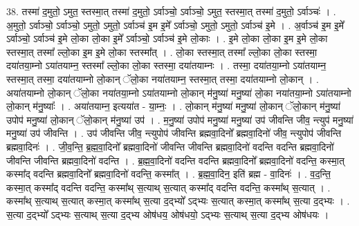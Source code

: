 \documentclass[17pt]{extarticle}
\begin{document}
38. तस्मा॑ द॒मुतो॒ ऽमुत॒ स्तस्मा॒त् तस्मा॑ द॒मुतो॒ ऽर्वाञ्चो॒ ऽर्वाञ्चो॒ ऽमुत॒ स्तस्मा॒त् तस्मा॑ द॒मुतो॒ ऽर्वाञ्चः॑ । . अ॒मुतो॒ ऽर्वाञ्चो॒ ऽर्वाञ्चो॒ ऽमुतो॒ ऽमुतो॒ ऽर्वाञ्च॑ इ॒म इ॒मे᳚ ऽर्वाञ्चो॒ ऽमुतो॒ ऽमुतो॒ ऽर्वाञ्च॑ इ॒मे । . अ॒र्वाञ्च॑ इ॒म इ॒मे᳚ ऽर्वाञ्चो॒ ऽर्वाञ्च॑ इ॒मे लो॒का लो॒का इ॒मे᳚ ऽर्वाञ्चो॒ ऽर्वाञ्च॑ इ॒मे लो॒काः । . इ॒मे लो॒का लो॒का इ॒म इ॒मे लो॒का स्तस्मा॒त् तस्मा᳚ ल्लो॒का इ॒म इ॒मे लो॒का स्तस्मा᳚त् । . लो॒का स्तस्मा॒त् तस्मा᳚ ल्लो॒का लो॒का स्तस्मा॒ दया॑तया॒म्नो ऽया॑तयाम्न॒ स्तस्मा᳚ ल्लो॒का लो॒का स्तस्मा॒ दया॑तयाम्नः । . तस्मा॒ दया॑तया॒म्नो ऽया॑तयाम्न॒ स्तस्मा॒त् तस्मा॒ दया॑तयाम्नो लो॒कान् ॅलो॒का नया॑तयाम्न॒ स्तस्मा॒त् तस्मा॒ दया॑तयाम्नो लो॒कान् । . अया॑तयाम्नो लो॒कान् ॅलो॒का नया॑तया॒म्नो ऽया॑तयाम्नो लो॒कान् म॑नु॒ष्या॑ मनु॒ष्या॑ लो॒का नया॑तया॒म्नो ऽया॑तयाम्नो लो॒कान् म॑नु॒ष्याः᳚ । . अया॑तयाम्न॒ इत्यया॑त - या॒म्नः॒ । . लो॒कान् म॑नु॒ष्या॑ मनु॒ष्या॑ लो॒कान् ॅलो॒कान् म॑नु॒ष्या॑ उपोप॑ मनु॒ष्या॑ लो॒कान् ॅलो॒कान् म॑नु॒ष्या॑ उप॑ । . म॒नु॒ष्या॑ उपोप॑ मनु॒ष्या॑ मनु॒ष्या॑ उप॑ जीवन्ति जीव॒ न्त्युप॑ मनु॒ष्या॑ मनु॒ष्या॑ उप॑ जीवन्ति । . उप॑ जीवन्ति जीव॒ न्त्युपोप॑ जीवन्ति ब्रह्मवा॒दिनो᳚ ब्रह्मवा॒दिनो॑ जीव॒ न्त्युपोप॑ जीवन्ति ब्रह्मवा॒दिनः॑ । . जी॒व॒न्ति॒ ब्र॒ह्म॒वा॒दिनो᳚ ब्रह्मवा॒दिनो॑ जीवन्ति जीवन्ति ब्रह्मवा॒दिनो॑ वदन्ति वदन्ति ब्रह्मवा॒दिनो॑ जीवन्ति जीवन्ति ब्रह्मवा॒दिनो॑ वदन्ति । . ब्र॒ह्म॒वा॒दिनो॑ वदन्ति वदन्ति ब्रह्मवा॒दिनो᳚ ब्रह्मवा॒दिनो॑ वदन्ति॒ कस्मा॒त् कस्मा᳚द् वदन्ति ब्रह्मवा॒दिनो᳚ ब्रह्मवा॒दिनो॑ वदन्ति॒ कस्मा᳚त् । . ब्र॒ह्म॒वा॒दिन॒ इति॑ ब्रह्म - वा॒दिनः॑ । . व॒द॒न्ति॒ कस्मा॒त् कस्मा᳚द् वदन्ति वदन्ति॒ कस्मा᳚थ् स॒त्याथ् स॒त्यात् कस्मा᳚द् वदन्ति वदन्ति॒ कस्मा᳚थ् स॒त्यात् । . कस्मा᳚थ् स॒त्याथ् स॒त्यात् कस्मा॒त् कस्मा᳚थ् स॒त्या द॒द्भ्यो᳚ ऽद्भ्यः स॒त्यात् कस्मा॒त् कस्मा᳚थ् स॒त्या द॒द्भ्यः । . स॒त्या द॒द्भ्यो᳚ ऽद्भ्यः स॒त्याथ् स॒त्या द॒द्भ्य ओष॑धय॒ ओष॑धयो॒ ऽद्भ्यः स॒त्याथ् स॒त्या द॒द्भ्य ओष॑धयः । \newline
\end{document}
